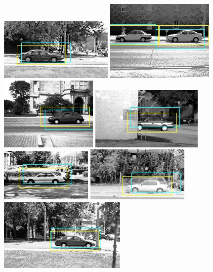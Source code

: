 \begin{figure}[!htbp]
\centering

\includegraphics[scale=0.75]{test-0_good.jpg}
\includegraphics[scale=0.75]{test-10_good.jpg}
\includegraphics[scale=0.75]{test-14_good.jpg}
\includegraphics[scale=0.75]{test-16_good.jpg}
\includegraphics[scale=0.75]{test-20_good.jpg}
\includegraphics[scale=0.75]{test-21_good.jpg}
\includegraphics[scale=0.75]{test-22_good.jpg}

\end{figure}

